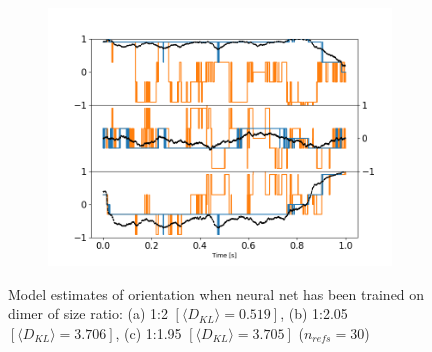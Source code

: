\begin{figure}[h!]
\begin{subfigure}{0.31\textwidth}
	\end{subfigure}
	\begin{subfigure}{0.31\textwidth}
		\subcaption{}
		\includegraphics[width=\textwidth]{fig8c.png}
	\end{subfigure}
	\caption{Model estimates of orientation when neural net has 
		been trained on dimer of size ratio: (a) 1:2 $[\langle D_{KL}\rangle=0.519]$, (b) 1:2.05 $[\langle D_{KL}
		\rangle=3.706]$, (c) 1:1.95 $[\langle D_{KL}\rangle=
		3.705]$ ($n_{refs} = 30$)}
	\label{fig:size}
\end{figure}

